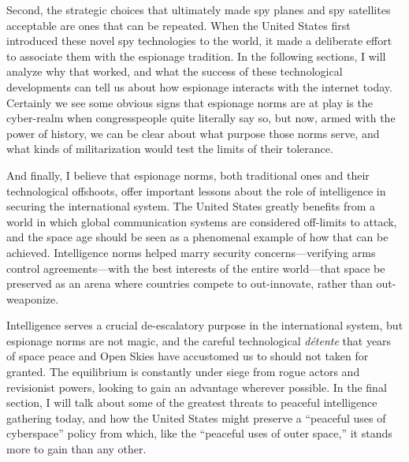 \documentclass{report}
\begin{document}
Second, the strategic choices that ultimately made spy planes and spy satellites acceptable are ones that can be repeated. When the United States first introduced these novel spy technologies to the world, it made a deliberate effort to associate them with the espionage tradition. In the following sections, I will analyze why that worked, and what the success of these technological developments can tell us about how espionage interacts with the internet today. Certainly we see some obvious signs that espionage norms are at play is the cyber-realm when congresspeople quite literally say so, but now, armed with the power of history, we can be clear about what purpose those norms serve, and what kinds of militarization would test the limits of their tolerance.

And finally, I believe that espionage norms, both traditional ones and their technological offshoots, offer important lessons about the role of intelligence in securing the international system. The United States greatly benefits from a world in which global communication systems are considered off-limits to attack, and the space age should be seen as a phenomenal example of how that can be achieved. Intelligence norms helped marry security concerns---verifying arms control agreements---with the best interests of the entire world---that space be preserved as an arena where countries compete to out-innovate, rather than out-weaponize.

Intelligence serves a crucial de-escalatory purpose in the international system, but espionage norms are not magic, and the careful technological \emph{d\'etente} that years of space peace and Open Skies have accustomed us to should not taken for granted. The equilibrium is constantly under siege from rogue actors and revisionist powers, looking to gain an advantage wherever possible. In the final section, I will talk about some of the greatest threats to peaceful intelligence gathering today, and how the United States might preserve a ``peaceful uses of cyberspace'' policy from which, like the ``peaceful uses of outer space,'' it stands more to gain than any other.


\end{document}
